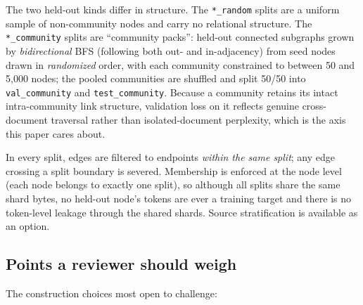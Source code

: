 The two held-out kinds differ in structure. The \texttt{*\_random} splits are a
uniform sample of non-community nodes and carry no relational structure. The
\texttt{*\_community} splits are ``community packs'': held-out connected subgraphs
grown by \emph{bidirectional} BFS (following both out- and in-adjacency) from
seed nodes drawn in \emph{randomized} order, with each community constrained to
between 50 and 5{,}000 nodes; the pooled communities are shuffled and split 50/50
into \texttt{val\_community} and \texttt{test\_community}. Because a community
retains its intact intra-community link structure, validation loss on it reflects
genuine cross-document traversal rather than isolated-document perplexity, which
is the axis this paper cares about.

In every split, edges are filtered to endpoints \emph{within the same split};
any edge crossing a split boundary is severed. Membership is enforced at the node
level (each node belongs to exactly one split), so although all splits share the
same shard bytes, no held-out node's tokens are ever a training target and there
is no token-level leakage through the shared shards. Source stratification is
available as an option.

\subsection{Points a reviewer should weigh}
\label{app:datasets:attack}

The construction choices most open to challenge:

